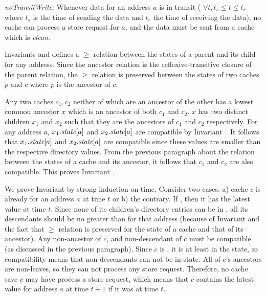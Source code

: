 \begin{inv}
\textit{noTransitWrite}: Whenever data for an address $a$ is in transit (\ie{}
$\forall t, t_s \le t \le t_r$ where $t_s$ is the time of sending the data and
$t_r$ the time of receiving the data), no cache can process a store request for
$a$, and the data must be sent from a cache which is \textit{clean}.
\label{noTransitWrite}
\end{inv}

Invariants  and  defines a
$\ge$ relation between the states of a parent and its child for any address.
Since the ancestor relation is the reflexive-transitive closure of the parent
relation, the $\ge$ relation is preserved between the states of two caches $p$
and $c$ where $p$ is the ancestor of $c$.

Any two caches $c_1, c_2$ neither of which are an ancestor of the other has a
lowest common ancestor $x$ which is an ancestor of both $c_1$ and $c_2$. $x$
has two distinct children $x_1$ and $x_2$ such that they are the ancestors of
$c_1$ and $c_2$ respectively. For any address $a$, $x_1.\textit{state}[a]$ and
$x_2.\textit{state}[a]$ are compatible by 
Invariant~. It follows that $x_1.\textit{state}[a]$ and
$x_2.\textit{state}[a]$ are compatible since these values are smaller than the
respective directory values. From the previous paragraph about the relation
between the states of a cache and its ancestor, it follows that $c_1$ and $c_2$
are also compatible. This proves Invariant .

We prove Invariant  by strong induction on time. Consider
two cases: a) cache $c$ is already \clean{} for an address $a$ at time $t$ or
b) the contrary.  If \clean{}, then it has the latest value at time $t$. Since
none of its children's directory entries can be in \Mo{}, all its descendants
should be no greater than \Sh{} for that address (because of Invariant
 and the fact that $\ge$ relation is preserved for the
state of a cache and that of its ancestor). Any non-ancestor of $c$, and
non-descendant of $c$ must be compatible (as discussed in the previous
paragraph).  Since $c$ is \clean, it is at least in the \Sh{} state, so
compatibility means that non-descendants can not be in \Mo{} state. All of
$c$'s ancestors are non-leaves, so they can not process any store request.
Therefore, no cache save $c$ may have process a store request, which means that
$c$ contains the latest value for address $a$ at time $t+1$ if it was \clean{}
at time $t$.

